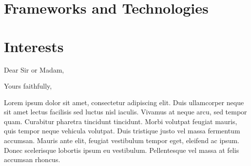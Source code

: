 \documentclass[11pt,a4paper,sans]{moderncv}        %
\begin{document}
\section{Frameworks and Technologies}

\section{Interests}

\nocite{*}



\clearpage
\date{January 01, 1984}
\opening{Dear Sir or Madam,}
\closing{Yours faithfully,}
\makelettertitle

Lorem ipsum dolor sit amet, consectetur adipiscing elit. Duis ullamcorper neque sit amet lectus facilisis sed luctus nisl iaculis. Vivamus at neque arcu, sed tempor quam. Curabitur pharetra tincidunt tincidunt. Morbi volutpat feugiat mauris, quis tempor neque vehicula volutpat. Duis tristique justo vel massa fermentum accumsan. Mauris ante elit, feugiat vestibulum tempor eget, eleifend ac ipsum. Donec scelerisque lobortis ipsum eu vestibulum. Pellentesque vel massa at felis accumsan rhoncus.
\end{document}
